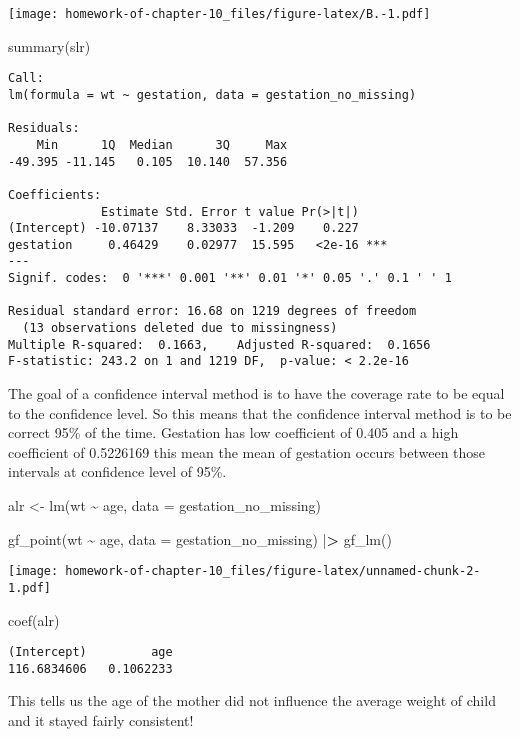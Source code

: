 \documentclass[
]{article}
\newenvironment{Shaded}{\begin{snugshade}}{\end{snugshade}}
\newcommand{\AttributeTok}[1]{\textcolor[rgb]{0.77,0.63,0.00}{#1}}
\newcommand{\ErrorTok}[1]{\textcolor[rgb]{0.64,0.00,0.00}{\textbf{#1}}}
\newcommand{\FunctionTok}[1]{\textcolor[rgb]{0.00,0.00,0.00}{#1}}
\newcommand{\NormalTok}[1]{#1}
\newcommand{\OtherTok}[1]{\textcolor[rgb]{0.56,0.35,0.01}{#1}}
\newcommand{\SpecialCharTok}[1]{\textcolor[rgb]{0.00,0.00,0.00}{#1}}
\begin{document}
\texttt{[image: homework-of-chapter-10\_files/figure-latex/B.-1.pdf]}

\begin{Shaded}
\begin{Highlighting}[]
\FunctionTok{summary}\NormalTok{(slr)}
\end{Highlighting}
\end{Shaded}

\begin{verbatim}
Call:
lm(formula = wt ~ gestation, data = gestation_no_missing)

Residuals:
    Min      1Q  Median      3Q     Max 
-49.395 -11.145   0.105  10.140  57.356 

Coefficients:
             Estimate Std. Error t value Pr(>|t|)    
(Intercept) -10.07137    8.33033  -1.209    0.227    
gestation     0.46429    0.02977  15.595   <2e-16 ***
---
Signif. codes:  0 '***' 0.001 '**' 0.01 '*' 0.05 '.' 0.1 ' ' 1

Residual standard error: 16.68 on 1219 degrees of freedom
  (13 observations deleted due to missingness)
Multiple R-squared:  0.1663,    Adjusted R-squared:  0.1656 
F-statistic: 243.2 on 1 and 1219 DF,  p-value: < 2.2e-16
\end{verbatim}

The goal of a confidence interval method is to have the coverage rate to
be equal to the confidence level. So this means that the confidence
interval method is to be correct 95\% of the time. Gestation has low
coefficient of 0.405 and a high coefficient of 0.5226169 this mean the
mean of gestation occurs between those intervals at confidence level of
95\%.

\begin{Shaded}
\begin{Highlighting}[]
\NormalTok{alr }\OtherTok{\textless{}{-}} \FunctionTok{lm}\NormalTok{(wt }\SpecialCharTok{\textasciitilde{}}\NormalTok{ age, }
          \AttributeTok{data =}\NormalTok{ gestation\_no\_missing)}

\FunctionTok{gf\_point}\NormalTok{(wt }\SpecialCharTok{\textasciitilde{}}\NormalTok{ age, }
         \AttributeTok{data =}\NormalTok{ gestation\_no\_missing) }\SpecialCharTok{|}\ErrorTok{\textgreater{}} 
  \FunctionTok{gf\_lm}\NormalTok{()}
\end{Highlighting}
\end{Shaded}

\texttt{[image: homework-of-chapter-10\_files/figure-latex/unnamed-chunk-2-1.pdf]}

\begin{Shaded}
\begin{Highlighting}[]
\FunctionTok{coef}\NormalTok{(alr)}
\end{Highlighting}
\end{Shaded}

\begin{verbatim}
(Intercept)         age 
116.6834606   0.1062233 
\end{verbatim}

This tells us the age of the mother did not influence the average weight
of child and it stayed fairly consistent!
\end{document}
